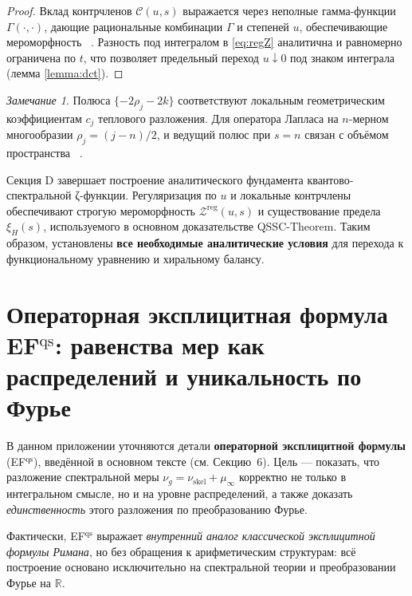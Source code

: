 \documentclass{article}
\numberwithin{equation}{section}
\theoremstyle{plain}
\theoremstyle{definition}
\theoremstyle{remark}
\newtheorem*{remark}{Замечание}
\def\rho{ρ}\def\sigma{σ}\def\Sigma{Σ}\def\tau{τ}%
\def\infty{∞}\def\partial{∂}\def\sum{Σ}\def\int{∫}%
\def\cdot{·}\def\times{×}\def\pm{±}\def\mp{∓}\def\approx{≈}%
\begin{document}
\begin{proof}
Вклад контрчленов $\mathcal C(u,s)$ выражается через неполные гамма-функции $\Gamma(\cdot,\cdot)$,
дающие рациональные комбинации $\Gamma$ и степеней $u$, обеспечивающие мероморфность ~\cite{Minakshisundaram1949}.
Разность под интегралом в \eqref{eq:regZ} аналитична и равномерно ограничена по $t$, что позволяет предельный переход $u\downarrow0$ под знаком интеграла (лемма \ref{lemma:dct}).
\end{proof}


\begin{remark}
Полюса $\{-2\rho_j-2k\}$ соответствуют локальным геометрическим коэффициентам $c_j$ 
теплового разложения. 
Для оператора Лапласа на $n$-мерном многообразии $\rho_j=(j-n)/2$, 
и ведущий полюс при $s=n$ связан с объёмом пространства ~\cite{Weyl1911}.
\end{remark}

\noindent
Секция D завершает построение аналитического фундамента квантово-спектральной ζ-функции.
Регуляризация по $u$ и локальные контрчлены обеспечивают строгую мероморфность $\mathcal Z^{\mathrm{reg}}(u,s)$
и существование предела $\xi_H(s)$, используемого в основном доказательстве QSSC-Theorem.
Таким образом, установлены \textbf{все необходимые аналитические условия}
для перехода к функциональному уравнению и хиральному балансу.

\clearpage

\section{Операторная эксплицитная формула EF$^{\mathrm{qs}}$: равенства мер как распределений и уникальность по Фурье}

\noindent
В данном приложении уточняются детали \textbf{операторной эксплицитной формулы} 
(EF$^{\mathrm{qs}}$), введённой в основном тексте (см. Секцию~6).  
Цель — показать, что разложение спектральной меры 
\(\nu_g = \nu_{\mathrm{skel}} + \mu_\infty\)
корректно не только в интегральном смысле, но и на уровне распределений,  
а также доказать \emph{единственность} этого разложения по преобразованию Фурье.

Фактически, EF$^{\mathrm{qs}}$ выражает \emph{внутренний аналог классической эксплицитной формулы Римана},
но без обращения к арифметическим структурам: всё построение основано исключительно
на спектральной теории и преобразовании Фурье на \(\mathbb R\).
\end{document}
